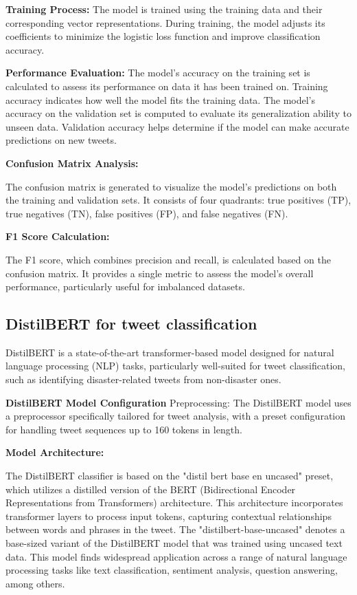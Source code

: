 \textbf{Training Process:}
The model is trained using the training data and their corresponding vector representations. During training, the model adjusts its coefficients to minimize the logistic loss function and improve classification accuracy.

\textbf{Performance Evaluation:}
The model's accuracy on the training set is calculated to assess its performance on data it has been trained on. Training accuracy indicates how well the model fits the training data. The model's accuracy on the validation set is computed to evaluate its generalization ability to unseen data.
Validation accuracy helps determine if the model can make accurate predictions on new tweets.

\textbf{Confusion Matrix Analysis:}

The confusion matrix is generated to visualize the model's predictions on both the training and validation sets.
It consists of four quadrants: true positives (TP), true negatives (TN), false positives (FP), and false negatives (FN).

\textbf{F1 Score Calculation:}

The F1 score, which combines precision and recall, is calculated based on the confusion matrix.
It provides a single metric to assess the model's overall performance, particularly useful for imbalanced datasets.



\subsection{DistilBERT for tweet classification}

DistilBERT is a state-of-the-art transformer-based model designed for natural language processing (NLP) tasks, particularly well-suited for tweet classification, such as identifying disaster-related tweets from non-disaster ones.

\textbf{DistilBERT Model Configuration}
Preprocessing:
The DistilBERT model uses a preprocessor specifically tailored for tweet analysis, with a preset configuration for handling tweet sequences up to 160 tokens in length.


\textbf{Model Architecture:}

The DistilBERT classifier is based on the "distil bert base en uncased" preset, which utilizes a distilled version of the BERT (Bidirectional Encoder Representations from Transformers) architecture. This architecture incorporates transformer layers to process input tokens, capturing contextual relationships between words and phrases in the tweet.
The "distilbert-base-uncased" denotes a base-sized variant of the DistilBERT model that was trained using uncased text data. This model finds widespread application across a range of natural language processing tasks like text classification, sentiment analysis, question answering, among others.

